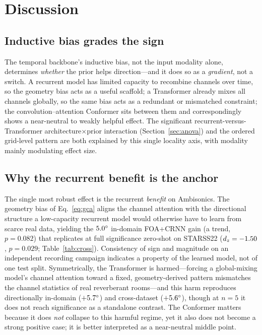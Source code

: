 \section{Discussion}
\label{sec:discussion}

\subsection{Inductive bias grades the sign}
The temporal backbone's inductive bias, not the input modality alone, determines
\emph{whether} the prior helps direction---and it does so as a \emph{gradient},
not a switch. A recurrent model has limited capacity to recombine channels over
time, so the geometry bias acts as a useful scaffold; a Transformer already
mixes all channels globally, so the same bias acts as a redundant or mismatched
constraint; the convolution--attention Conformer sits between them and
correspondingly shows a near-neutral to weakly helpful effect. The significant
recurrent-versus-Transformer architecture$\times$prior interaction
(Section~\ref{sec:anova}) and the ordered grid-level pattern are both explained
by this single locality axis, with modality mainly modulating effect size.

\subsection{Why the recurrent benefit is the anchor}
The single most robust effect is the recurrent \emph{benefit} on Ambisonics. The
geometry bias of Eq.~\eqref{eq:gca} aligns the channel attention with the
directional structure a low-capacity recurrent model would otherwise have to
learn from scarce real data, yielding the $5.0^\circ$ in-domain FOA+CRNN gain
(a trend, $p=0.082$) that replicates at full significance zero-shot on STARSS22
($d_z=-1.50$, $p=0.029$; Table~\ref{tab:cross}). Consistency of sign and magnitude
on an independent recording campaign indicates a property of the learned model,
not of one test split. Symmetrically, the
Transformer is harmed---forcing a global-mixing model's channel attention toward
a fixed, geometry-derived pattern mismatches the channel statistics of real
reverberant rooms---and this harm reproduces directionally in-domain
($+5.7^\circ$) and cross-dataset ($+5.6^\circ$), though at $n=5$ it does not
reach significance as a standalone contrast.
The Conformer matters because it does \emph{not} collapse to this harmful regime,
yet it also does not become a strong positive case; it is better interpreted as a
near-neutral middle point.

